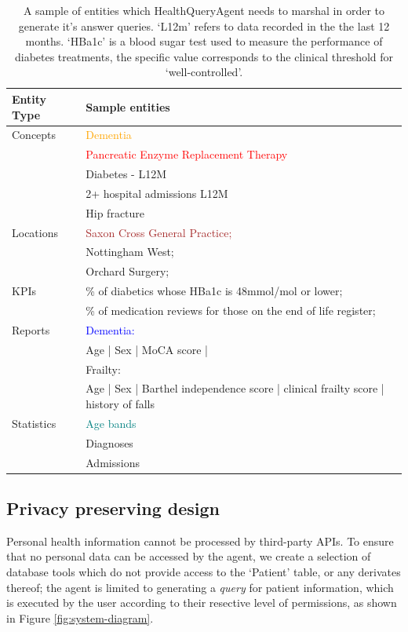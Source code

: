 \documentclass[11pt]{article}
\begin{document}
\begin{table}[t]
\centering
	\begin{tabular}{|p{2cm}|p{5cm}|}
\hline
	Entity Type & Sample entities \\

\hline
\hline
	Concepts 	& \textcolor{orange}{Dementia} \\
	 	        & \textcolor{red}{Pancreatic Enzyme Replacement Therapy} \\
			& Diabetes - L12M \\
			& 2+ hospital admissions L12M \\
			& Hip fracture \\ 
\hline
	Locations	& \textcolor{brown}{Saxon Cross General Practice;}\\	
			& Nottingham West; \\
			& Orchard Surgery; \\
\hline
	KPIs		& \% of diabetics whose HBa1c is 48mmol/mol or lower; \\
	 		& \% of medication reviews for those on the end of life register; \\	
\hline
	Reports		& \textcolor{blue}{Dementia:} \\
			& Age | Sex | MoCA score | \\
			& Frailty: \\
			& Age | Sex | Barthel independence score | clinical frailty score | history of falls \\
\hline
	Statistics	& \textcolor{teal}{Age bands} \\
			& Diagnoses \\
			& Admissions \\
\hline
\end{tabular}

\caption{
	A sample of entities which HealthQueryAgent needs to marshal in order to generate it's answer queries.
	`L12m' refers to data recorded in the the last 12 months.
	`HBa1c' is a blood sugar test used to measure the performance of diabetes treatments, the specific value corresponds to the clinical threshold for `well-controlled'.
}
	\label{tab:sample-entities}
\end{table}


\subsection{Privacy preserving design}
Personal health information cannot be processed by third-party APIs.
To ensure that no personal data can be accessed by the agent, we create a selection of database tools which do not provide access to the `Patient' table, or any derivates thereof; the agent is limited to generating a \textit{query} for patient information, which is executed by the user according to their resective level of permissions, as shown in Figure \ref{fig:system-diagram}.
\end{document}
